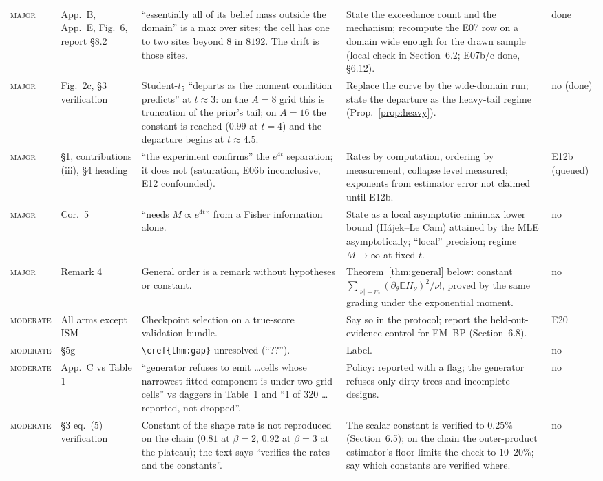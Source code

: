 \documentclass[11pt,a4paper]{article}
\newcommand{\sev}[1]{\textsc{#1}}
\newcommand{\E}{\mathbb{E}}
\theoremstyle{definition}
\theoremstyle{remark}
\begin{document}
{\begin{longtable}{@{}>{\raggedright\arraybackslash}p{1.75cm}>{\raggedright\arraybackslash}p{2.0cm}>{\raggedright\arraybackslash}p{6.05cm}>{\raggedright\arraybackslash}p{4.3cm}>{\raggedright\arraybackslash}p{0.9cm}@{}}
\sev{major} & App.\ B, App.\ E, Fig.\ 6, report \S8.2 & ``essentially all of its belief mass outside the domain'' is a max over sites; the cell has one to two sites beyond $8$ in $8192$. The drift is those sites. & State the exceedance count and the mechanism; recompute the E07 row on a domain wide enough for the drawn sample (local check in Section~6.2; E07b/c done, \S6.12). & done \\
\sev{major} & Fig.\ 2c, \S3 verification & Student-$t_5$ ``departs as the moment condition predicts'' at $t\approx3$: on the $A=8$ grid this is truncation of the prior's tail; on $A=16$ the constant is reached ($0.99$ at $t=4$) and the departure begins at $t\approx4.5$. & Replace the curve by the wide-domain run; state the departure as the heavy-tail regime (Prop.~\ref{prop:heavy}). & no (done) \\
\sev{major} & \S1, contributions (iii), \S4 heading & ``the experiment confirms'' the $e^{4t}$ separation; it does not (saturation, E06b inconclusive, E12 confounded). & Rates by computation, ordering by measurement, collapse level measured; exponents from estimator error not claimed until E12b. & E12b (queued) \\
\sev{major} & Cor.\ 5 & ``needs $M\propto e^{4t}$'' from a Fisher information alone. & State as a local asymptotic minimax lower bound (H\'ajek--Le Cam) attained by the MLE asymptotically; ``local'' precision; regime $M\to\infty$ at fixed $t$. & no \\
\sev{major} & Remark 4 & General order is a remark without hypotheses or constant. & Theorem~\ref{thm:general} below: constant $\sum_{|\nu|=m}(\partial_\theta\E H_\nu)^2/\nu!$, proved by the same grading under the exponential moment. & no \\
\sev{moderate} & All arms except ISM & Checkpoint selection on a true-score validation bundle. & Say so in the protocol; report the held-out-evidence control for EM--BP (Section~6.8). & E20 \\
\sev{moderate} & \S5g & \verb|\cref{thm:gap}| unresolved (``??''). & Label. & no \\
\sev{moderate} & App.\ C vs Table 1 & ``generator refuses to emit \ldots cells whose narrowest fitted component is under two grid cells'' vs daggers in Table~1 and ``1 of 320 \ldots reported, not dropped''. & Policy: reported with a flag; the generator refuses only dirty trees and incomplete designs. & no \\
\sev{moderate} & \S3 eq.\ (5) verification & Constant of the shape rate is not reproduced on the chain ($0.81$ at $\beta=2$, $0.92$ at $\beta=3$ at the plateau); the text says ``verifies the rates and the constants''. & The scalar constant is verified to $0.25\%$ (Section~6.5); on the chain the outer-product estimator's floor limits the check to $10$--$20\%$; say which constants are verified where. & no \\

\end{longtable}}
\end{document}
